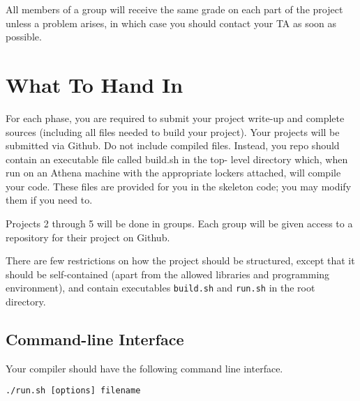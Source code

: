 \documentclass[11pt]{article}
\begin{document}
All members of a group will receive the same grade on each part of the project unless a problem arises, in which case you should contact your TA as soon as possible.

\section{What To Hand In}

For each phase, you are required to submit your project write-up and complete sources (including all files needed to build your project).
Your projects will be submitted via Github.
Do not include compiled files.
Instead, you repo should contain an executable file called build.sh in the top- level directory which, when run on an Athena machine with the appropriate lockers attached, will compile your code.
These files are provided for you in the skeleton code;
you may modify them if you need to.

Projects 2 through 5 will be done in groups.
Each group will be given access to a repository for their project on Github.

There are few restrictions on how the project should be structured, except that it should be self-contained (apart from the allowed libraries and programming environment), and contain executables {\tt build.sh} and {\tt run.sh} in the root directory.

\subsection{Command-line Interface}

Your compiler should have the following command line interface.

\begin{verbatim}
./run.sh [options] filename
\end{verbatim}
\end{document}
